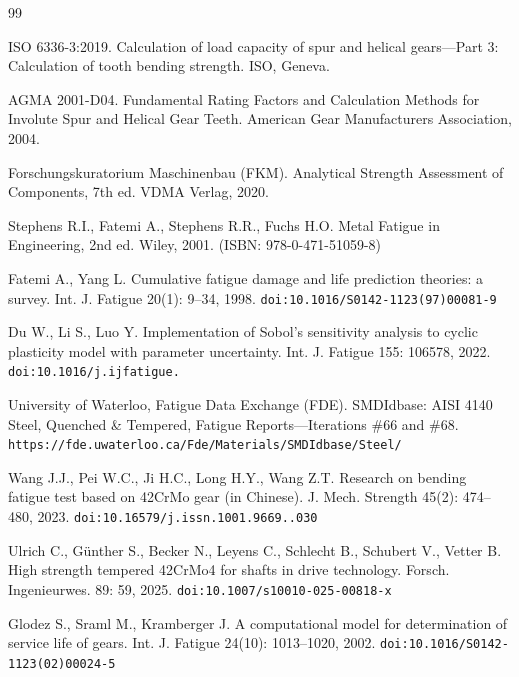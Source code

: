 \documentclass[twocolumn,12pt,a4paper]{article}
\begin{document}
\begin{thebibliography}{99}

ISO 6336-3:2019. Calculation of load capacity of spur and helical
gears---Part 3: Calculation of tooth bending strength. ISO, Geneva.

AGMA 2001-D04. Fundamental Rating Factors and Calculation Methods for
Involute Spur and Helical Gear Teeth. American Gear Manufacturers
Association, 2004.

Forschungskuratorium Maschinenbau (FKM). Analytical Strength Assessment
of Components, 7th ed. VDMA Verlag, 2020.

Stephens R.I., Fatemi A., Stephens R.R., Fuchs H.O. Metal Fatigue in
Engineering, 2nd ed. Wiley, 2001. (ISBN: 978-0-471-51059-8)

Fatemi A., Yang L. Cumulative fatigue damage and life prediction
theories: a survey. Int. J. Fatigue 20(1): 9--34, 1998.
\texttt{doi:10.1016/\allowbreak S0142-1123\allowbreak (97)00081-9}

Du W., Li S., Luo Y. Implementation of Sobol's sensitivity analysis to
cyclic plasticity model with parameter uncertainty. Int. J. Fatigue
155: 106578, 2022.
\texttt{doi:10.1016/\allowbreak j.ijfatigue.}

University of Waterloo, Fatigue Data Exchange (FDE). SMDIdbase: AISI
4140 Steel, Quenched \& Tempered, Fatigue Reports---Iterations \#66 and
\#68. \texttt{https://fde.uwaterloo.ca/\allowbreak Fde/Materials/\allowbreak SMDIdbase/Steel/}

Wang J.J., Pei W.C., Ji H.C., Long H.Y., Wang Z.T. Research on bending
fatigue test based on 42CrMo gear (in Chinese). J. Mech. Strength
45(2): 474--480, 2023.
\texttt{doi:10.16579/\allowbreak j.issn.1001.9669..030}

Ulrich C., G\"unther S., Becker N., Leyens C., Schlecht B., Schubert V.,
Vetter B. High strength tempered 42CrMo4 for shafts in drive technology.
Forsch. Ingenieurwes. 89: 59, 2025.
\texttt{doi:10.1007/\allowbreak s10010-025-00818-x}

Glodez S., Sraml M., Kramberger J. A computational model for
determination of service life of gears. Int. J. Fatigue 24(10):
1013--1020, 2002. \texttt{doi:10.1016/S0142-1123(02)00024-5}


\end{thebibliography}
\end{document}
